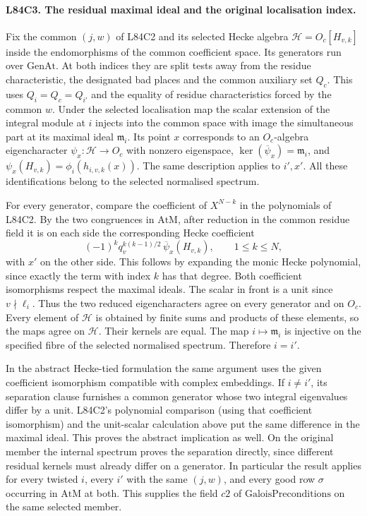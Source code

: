 \paragraph{L84C3. The residual maximal ideal and the original localisation index.}
Fix the common $(j,w)$ of L84C2 and its selected Hecke algebra
$\mathcal H=O_c[H_{v,k}]$ inside the endomorphisms of the common
coefficient space. Its generators run over $\mathrm{GenAt}$.
At both indices they are split tests away from the residue
characteristic, the designated bad places and the common auxiliary
set $Q_c$. This uses $Q_i=Q_c=Q_{i'}$ and the equality of residue
characteristics forced by the common $w$. Under the selected
localisation map the scalar extension of the integral module
at $i$ injects into the common space with image the simultaneous
part at its maximal ideal $\mathfrak m_i$. Its point $x$
corresponds to an $O_c$-algebra eigencharacter
$\psi_x:\mathcal H\to O_c$ with nonzero eigenspace,
$\ker(\overline{\psi}_x)=\mathfrak m_i$, and
$\psi_x(H_{v,k})=\phi_i(h_{i,v,k}(x))$. The same description
applies to $i',x'$. All these identifications belong to the
selected normalised spectrum.

For every generator, compare the coefficient of $X^{N-k}$ in
the polynomials of L84C2. By the two congruences in $\mathrm{AtM}$,
after reduction in the common residue field it is on each side
the corresponding Hecke coefficient
\[
 (-1)^k q_v^{k(k-1)/2}\,\overline\psi_x(H_{v,k}),
 \qquad 1\le k\le N ,
\]
with $x'$ on the other side. This follows by expanding the monic
Hecke polynomial, since exactly the term with index $k$ has that
degree. Both coefficient isomorphisms respect the maximal ideals.
The scalar in front is a unit since $v\nmid\ell_i$. Thus the two
reduced eigencharacters agree on every generator and on $O_c$.
Every element of $\mathcal H$ is obtained by finite sums and
products of these elements, so the maps agree on $\mathcal H$.
Their kernels are equal. The map $i\mapsto\mathfrak m_i$ is injective
on the specified fibre of the selected normalised spectrum.
Therefore $i=i'$.

In the abstract Hecke-tied formulation the same argument uses the
given coefficient isomorphism compatible with complex embeddings.
If $i\ne i'$, its separation clause furnishes a common generator
whose two integral eigenvalues differ by a unit. L84C2's polynomial
comparison (using that coefficient isomorphism) and the unit-scalar
calculation above put the same difference in the maximal ideal.
This proves the abstract implication as well. On the original
member the internal spectrum proves the separation directly, since
different residual kernels must already differ on a generator.
In particular the result applies for every twisted $i$, every
$i'$ with the same $(j,w)$, and every good row $\sigma$ occurring
in $\mathrm{AtM}$ at both. This supplies the field $c2$ of
$\mathrm{GaloisPreconditions}$ on the same selected member.
